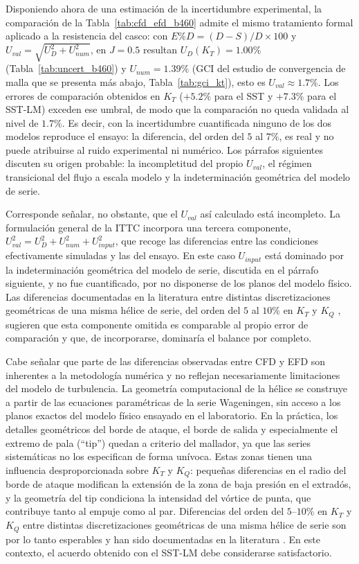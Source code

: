 Disponiendo ahora de una estimación de la incertidumbre experimental, la comparación de la Tabla~\ref{tab:cfd_efd_b460} admite el mismo tratamiento formal aplicado a la resistencia del casco: con $E\%D = (D-S)/D\times100$ y $U_{val} = \sqrt{U_D^2 + U_{num}^2}$, en $J = 0.5$ resultan $U_D(K_T) = 1.00\%$ (Tabla~\ref{tab:uncert_b460}) y $U_{num} = 1.39\%$ (GCI del estudio de convergencia de malla que se presenta más abajo, Tabla~\ref{tab:gci_kt}), esto es $U_{val} \approx 1.7\%$. Los errores de comparación obtenidos en $K_T$ ($+5.2\%$ para el SST y $+7.3\%$ para el SST-LM) exceden ese umbral, de modo que la comparación no queda validada al nivel de $1.7\%$. Es decir, con la incertidumbre cuantificada ninguno de los dos modelos reproduce el ensayo: la diferencia, del orden del $5$ al $7\%$, es real y no puede atribuirse al ruido experimental ni numérico. Los párrafos siguientes discuten su origen probable: la incompletitud del propio $U_{val}$, el régimen transicional del flujo a escala modelo y la indeterminación geométrica del modelo de serie.

Corresponde señalar, no obstante, que el $U_{val}$ así calculado está incompleto. La formulación general de la ITTC incorpora una tercera componente, $U_{val}^2 = U_D^2 + U_{num}^2 + U_{input}^2$, que recoge las diferencias entre las condiciones efectivamente simuladas y las del ensayo. En este caso $U_{input}$ está dominado por la indeterminación geométrica del modelo de serie, discutida en el párrafo siguiente, y no fue cuantificado, por no disponerse de los planos del modelo físico. Las diferencias documentadas en la literatura entre distintas discretizaciones geométricas de una misma hélice de serie, del orden del $5$ al $10\%$ en $K_T$ y $K_Q$ \citep{gaggero2018transition}, sugieren que esta componente omitida es comparable al propio error de comparación y que, de incorporarse, dominaría el balance por completo.

Cabe señalar que parte de las diferencias observadas entre CFD y EFD son inherentes a la metodología numérica y no reflejan necesariamente limitaciones del modelo de turbulencia. La geometría computacional de la hélice se construye a partir de las ecuaciones paramétricas de la serie Wageningen, sin acceso a los planos exactos del modelo físico ensayado en el laboratorio. En la práctica, los detalles geométricos del borde de ataque, el borde de salida y especialmente el extremo de pala (``tip'') quedan a criterio del mallador, ya que las series sistemáticas no los especifican de forma unívoca. Estas zonas tienen una influencia desproporcionada sobre $K_T$ y $K_Q$: pequeñas diferencias en el radio del borde de ataque modifican la extensión de la zona de baja presión en el extradós, y la geometría del tip condiciona la intensidad del vórtice de punta, que contribuye tanto al empuje como al par. Diferencias del orden del $5$--$10\%$ en $K_T$ y $K_Q$ entre distintas discretizaciones geométricas de una misma hélice de serie son por lo tanto esperables y han sido documentadas en la literatura \citep{gaggero2018transition}. En este contexto, el acuerdo obtenido con el SST-LM debe considerarse satisfactorio.

